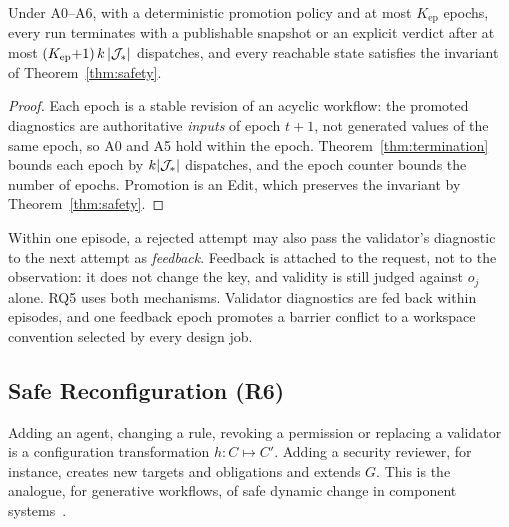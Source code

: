 \begin{proposition}\label{prop:epochs}
Under A0--A6, with a deterministic promotion policy and at most $K_{\mathrm{ep}}$ epochs, every run terminates with a publishable snapshot or an explicit verdict after at most $(K_{\mathrm{ep}}{+}1)\,k\,|\mathcal J_*|$ dispatches, and every reachable state satisfies the invariant of Theorem~\ref{thm:safety}.
\end{proposition}
\begin{proof}
Each epoch is a stable revision of an acyclic workflow: the promoted diagnostics are authoritative \emph{inputs} of epoch $t+1$, not generated values of the same epoch, so A0 and A5 hold within the epoch. Theorem~\ref{thm:termination} bounds each epoch by $k|\mathcal J_*|$ dispatches, and the epoch counter bounds the number of epochs. Promotion is an Edit, which preserves the invariant by Theorem~\ref{thm:safety}.
\end{proof}

Within one episode, a rejected attempt may also pass the validator's diagnostic to the next attempt as \emph{feedback}. Feedback is attached to the request, not to the observation: it does not change the key, and validity is still judged against $o_j$ alone. RQ5 uses both mechanisms. Validator diagnostics are fed back within episodes, and one feedback epoch promotes a barrier conflict to a workspace convention selected by every design job.

\subsection{Safe Reconfiguration (R6)}
Adding an agent, changing a rule, revoking a permission or replacing a validator is a configuration transformation $h:C\mapsto C'$. Adding a security reviewer, for instance, creates new targets and obligations and extends $G$. This is the analogue, for generative workflows, of safe dynamic change in component systems~\cite{kramer1990evolving,vandewoude2007tranquility}.

